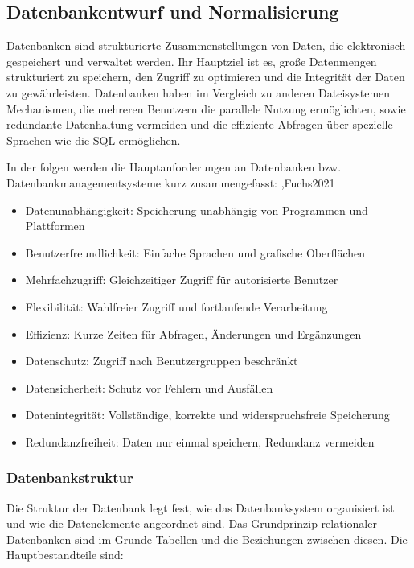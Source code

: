 \usepackage{biblatex}\subsection{Datenbankentwurf und Normalisierung}
\label{subsec:datenbankentwurf-und-normalisierung}
Datenbanken sind strukturierte Zusammenstellungen von Daten, die elektronisch gespeichert und verwaltet werden.
Ihr Hauptziel ist es, große Datenmengen strukturiert zu speichern, den Zugriff zu optimieren und die Integrität der Daten zu gewährleisten.
Datenbanken haben im Vergleich zu anderen Dateisystemen Mechanismen, die mehreren Benutzern die parallele Nutzung ermöglichten,
sowie redundante Datenhaltung vermeiden und die effiziente Abfragen über spezielle Sprachen wie die \ac{SQL} ermöglichen.\cite*[6]{Fuchs2021}

In der folgen werden die Hauptanforderungen an Datenbanken bzw. Datenbankmanagementsysteme kurz zusammengefasst:  \cite*[7]{Herrmann2018},\cite*[6]{Fuchs2021}Fuchs2021
\begin{itemize}
\item Datenunabhängigkeit: Speicherung unabhängig von Programmen und Plattformen
\item
Benutzerfreundlichkeit: Einfache Sprachen und grafische Oberflächen
\item
Mehrfachzugriff: Gleichzeitiger Zugriff für autorisierte Benutzer
\item
Flexibilität: Wahlfreier Zugriff und fortlaufende Verarbeitung
\item
Effizienz: Kurze Zeiten für Abfragen, Änderungen und Ergänzungen
\item
Datenschutz: Zugriff nach Benutzergruppen beschränkt
\item
Datensicherheit: Schutz vor Fehlern und Ausfällen
\item
Datenintegrität: Vollständige, korrekte und widerspruchsfreie Speicherung
\item
Redundanzfreiheit: Daten nur einmal speichern, Redundanz vermeiden
\end{itemize}



\subsubsection{Datenbankstruktur}
Die Struktur der Datenbank legt fest, wie das Datenbanksystem organisiert ist und wie die Datenelemente angeordnet sind.
Das Grundprinzip relationaler Datenbanken sind im Grunde Tabellen und die Beziehungen zwischen diesen.
Die Hauptbestandteile sind: \cite*[35]{Gadatsch2019}

